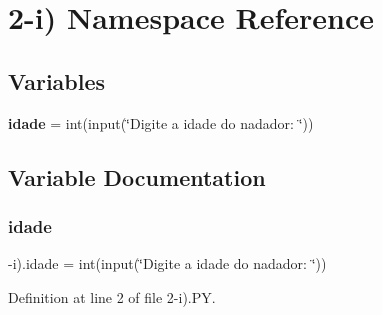 \section{2-\/i) Namespace Reference}
\label{namespace2-i_08}
\subsection*{Variables}
\begin{DoxyCompactItemize}
\item 
\textbf{ idade} = int(input(\char`\"{}Digite a idade do nadador\+: \char`\"{}))
\end{DoxyCompactItemize}


\subsection{Variable Documentation}
\mbox{\label{namespace2-i_08_a5d28a03510858fb152c66f40541ca3e3}} 
\subsubsection{idade}
{\footnotesize{}-\/i).idade = int(input(\char`\"{}Digite a idade do nadador\+: \char`\"{}))}



Definition at line 2 of file 2-\/i).\+PY.

